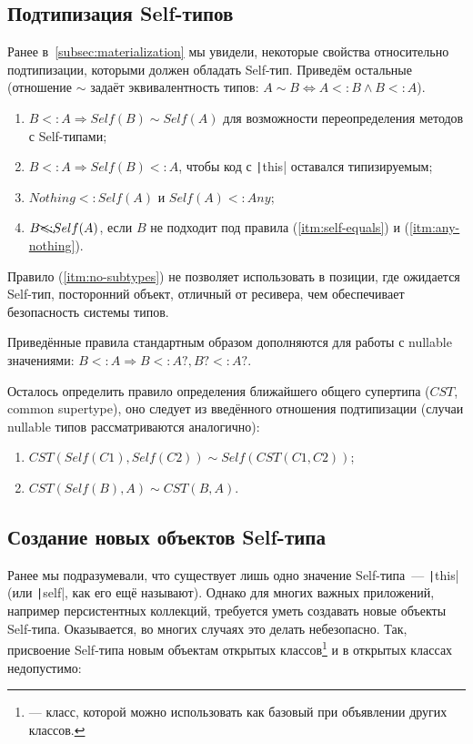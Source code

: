 \subsection{Подтипизация Self-типов} \label{subsec:self-subtyping}

Ранее в~\ref{subsec:materialization} мы увидели, некоторые свойства относительно подтипизации, которыми должен обладать Self-тип.
Приведём остальные (отношение $\sim$ задаёт эквивалентность типов: $A \sim B \iff A <: B \land B <: A$).

\begin{enumerate}
    \item \label{itm:self-equals} $B <: A \Rightarrow Self(B) \sim Self(A)$ для возможности переопределения методов с Self-типами;
    \item \label{itm:this-subtype} $B <: A \Rightarrow Self(B) <: A$, чтобы код с \texttt|this| оставался типизируемым;
    \item \label{itm:any-nothing} $Nothing <: Self(A)$ и $Self(A) <: Any$;
    \item \label{itm:no-subtypes} $B \bcancel{<:} Self(A)$, если $B$ не подходит под правила (\ref{itm:self-equals}) и (\ref{itm:any-nothing}).
\end{enumerate}

Правило (\ref{itm:no-subtypes}) не позволяет использовать в позиции, где ожидается Self-тип, посторонний объект, отличный от ресивера, чем обеспечивает безопасность системы типов.

Приведённые правила стандартным образом дополняются для работы с nullable значениями:
$B <: A \Rightarrow B <: A?, B? <: A?$.

Осталось определить правило определения ближайшего общего супертипа ($CST$, common supertype), оно следует из введённого отношения подтипизации (случаи nullable типов рассматриваются аналогично):
\begin{enumerate}
    \item $CST(Self(C1), Self(C2)) \sim Self(CST(C1, C2))$;
    \item $CST(Self(B), A) \sim CST(B, A)$.
\end{enumerate}


\subsection{Создание новых объектов Self-типа} \label{subsec:new}

Ранее мы подразумевали, что существует лишь одно значение Self-типа~--- \texttt|this| (или \texttt|self|, как его ещё называют).
Однако для многих важных приложений, например персистентных коллекций, требуется уметь создавать новые объекты Self-типа.
Оказывается, во многих случаях это делать небезопасно.
Так, присвоение Self-типа новым объектам открытых классов\footnote{ --- класс, которой можно использовать как базовый при объявлении других классов.} и в открытых классах недопустимо:

